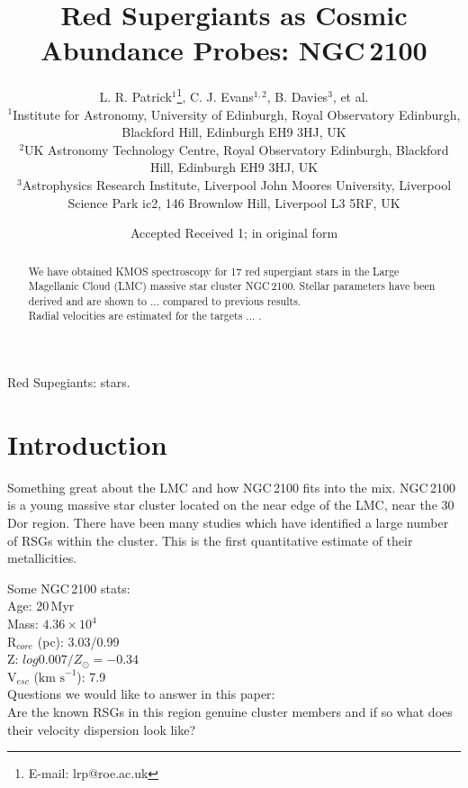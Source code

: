 \documentclass[useAMS,usenatbib]{mn2e}
\title[Red Supergiants as Cosmic Abundance Probes: NGC\,2100]{Red Supergiants as Cosmic Abundance Probes: NGC\,2100}
\author[L. R. Patrick et al.]{L. R. Patrick$^{1}$\thanks{E-mail: lrp@roe.ac.uk}, C. J. Evans$^{1, 2}$, B. Davies$^{3}$, et al.\\
$^{1}$Institute for Astronomy, University of Edinburgh, Royal Observatory Edinburgh, Blackford Hill, Edinburgh EH9 3HJ, UK\\
$^{2}$UK Astronomy Technology Centre, Royal Observatory Edinburgh, Blackford Hill, Edinburgh EH9 3HJ, UK\\
$^{3}$Astrophysics Research Institute, Liverpool John Moores University, Liverpool Science Park ic2, 146 Brownlow Hill, Liverpool L3 5RF, UK
}
\def\kms{$\mbox{km s}^{-1}$}
\begin{document}
\date{Accepted  Received 1; in original form}

\pagerange{\pageref{firstpage}--\pageref{lastpage}} 

\maketitle

\label{firstpage}

\begin{abstract}
We have obtained KMOS spectroscopy for 17 red supergiant stars in the Large Magellanic Cloud (LMC) massive star cluster NGC\,2100.
Stellar parameters have been derived and are shown to ... compared to previous results.\\
Radial velocities are estimated for the targets ... .\\


\end{abstract}

\begin{keywords}
Red Supegiants: stars.
\end{keywords}

\section{Introduction} %
\label{sec:introduction}

Something great about the LMC and how NGC\,2100 fits into the mix.
NGC\,2100 is a young massive star cluster located on the near edge of the LMC, near the 30 Dor region.
There have been many studies which have identified a large number of RSGs within the cluster.
This is the first quantitative estimate of their metallicities.

Some NGC\,2100 stats:\\
Age: 20\,Myr~\citep{2015A&A...575A..62N} \\
Mass: $4.36\times10^{4}$~\citep{2005ApJS..161..304M}\\
R$_{core}$ (pc): 3.03/0.99~\citep{2005ApJS..161..304M}\\
Z: $log0.007/Z_{\odot} = -0.34$~\citep{2015A&A...575A..62N}\\
V$_{esc}$ (\kms): 7.9~\citep{2005ApJS..161..304M}\\



Questions we would like to answer in this paper:\\
Are the known RSGs in this region genuine cluster members and if so what does their velocity dispersion look like?\\
\end{document}
